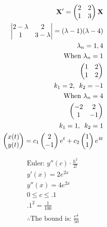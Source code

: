 \documentclass[12pt]{article}
\begin{document}
\newpage
\hline

\begin{equation}
  \begin{split}
    \bold{X}'=\begin{pmatrix} 2 & 2 \\ 1 & 3  \end{pmatrix}\bold{X}\\
    \begin{vmatrix} 2-\lambda & 2\\ 1 & 3-\lambda \end{vmatrix}=(\lambda-1)(\lambda-4)\\
    \lambda_n=1,4\\
    \text{When }\lambda_n=1\\
    \begin{pmatrix} 1 & 2 \\ 1 & 2 \end{pmatrix} \\
    k_1=2,\,\,\,k_2=-1\\
    \text{When }\lambda_n=4\\
    \begin{pmatrix} -2 & 2 \\ 1 & -1 \end{pmatrix} \\
    k_1=1,\,\,\,k_2=1\\
    \begin{pmatrix} x(t) \\ y(t) \end{pmatrix}=c_1\begin{pmatrix} 2 \\ -1 \end{pmatrix}e^{t}+c_2\begin{pmatrix} 1 \\ 1\end{pmatrix}e^{4t}
  \end{split}
  \label{6}
\end{equation}
\hline


\begin{equation}
  \begin{split}
    \text{Euler: }y''(c)\cdot\frac{h^2}{2!}\\
    y'(x)=2e^{2x}\\
    y''(x)=4e^{2x}\\
    0\leq c\leq .1\\
    .1^2=\frac{1}{100}\\
    \therefore \text{The bound is: } \frac{e^{\frac{1}{5}}}{50}
  \end{split}
  \label{7}
\end{equation}
\hline
\end{document}
